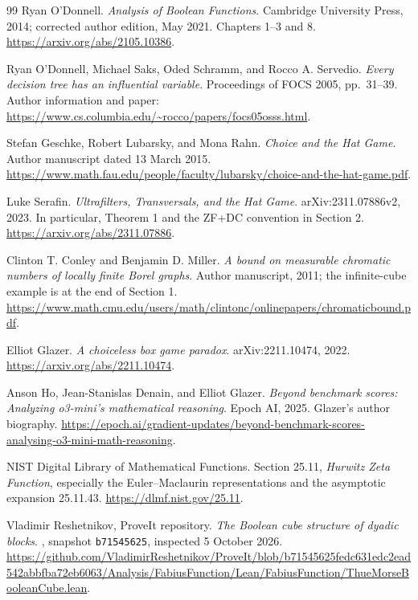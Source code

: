 \documentclass[11pt,a4paper]{article}
\theoremstyle{definition}
\theoremstyle{remark}
\begin{document}
\begin{thebibliography}{99}
Ryan O'Donnell.
\emph{Analysis of Boolean Functions}.
Cambridge University Press, 2014; corrected author edition, May 2021.
Chapters 1--3 and 8.
\url{https://arxiv.org/abs/2105.10386}.

Ryan O'Donnell, Michael Saks, Oded Schramm, and Rocco A. Servedio.
\emph{Every decision tree has an influential variable}.
Proceedings of FOCS 2005, pp.\ 31--39.
Author information and paper:
\url{https://www.cs.columbia.edu/~rocco/papers/focs05osss.html}.

Stefan Geschke, Robert Lubarsky, and Mona Rahn.
\emph{Choice and the Hat Game}.
Author manuscript dated 13 March 2015.
\url{https://www.math.fau.edu/people/faculty/lubarsky/choice-and-the-hat-game.pdf}.

Luke Serafin.
\emph{Ultrafilters, Transversals, and the Hat Game}.
arXiv:2311.07886v2, 2023. In particular, Theorem 1 and the ZF+DC
convention in Section 2.
\url{https://arxiv.org/abs/2311.07886}.

Clinton T. Conley and Benjamin D. Miller.
\emph{A bound on measurable chromatic numbers of locally finite Borel graphs}.
Author manuscript, 2011; the infinite-cube example is at the end of Section 1.
\url{https://www.math.cmu.edu/users/math/clintonc/onlinepapers/chromaticbound.pdf}.

Elliot Glazer.
\emph{A choiceless box game paradox}.
arXiv:2211.10474, 2022.
\url{https://arxiv.org/abs/2211.10474}.

Anson Ho, Jean-Stanislas Denain, and Elliot Glazer.
\emph{Beyond benchmark scores: Analyzing o3-mini's mathematical reasoning}.
Epoch AI, 2025. Glazer's author biography.
\url{https://epoch.ai/gradient-updates/beyond-benchmark-scores-analysing-o3-mini-math-reasoning}.

NIST Digital Library of Mathematical Functions.
Section 25.11, \emph{Hurwitz Zeta Function}, especially the
Euler--Maclaurin representations and the asymptotic expansion
25.11.43.
\url{https://dlmf.nist.gov/25.11}.

Vladimir Reshetnikov, ProveIt repository.
\emph{The Boolean cube structure of dyadic blocks}.
,
snapshot \texttt{b71545625}, inspected 5 October 2026.
\url{https://github.com/VladimirReshetnikov/ProveIt/blob/b71545625fedc631edc2ead542abbfba72eb6063/Analysis/FabiusFunction/Lean/FabiusFunction/ThueMorseBooleanCube.lean}.


\end{thebibliography}
\end{document}
